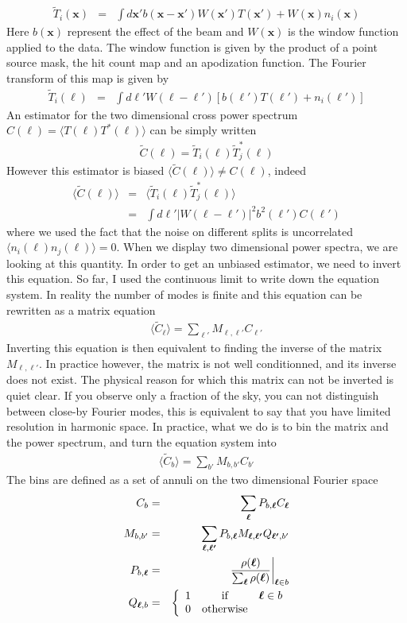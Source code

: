 \documentclass[a4paper, 11pt]{article}
\def\ba{\begin{eqnarray}}
\def\ea{\end{eqnarray}}
\begin{document}
\ba
\tilde{T}_{i}(\bm{x}) &=& \int d\bm{x'} b( \bm{x}-\bm{x'}) W(\bm{x'}) T(\bm{x'})+W( \bm{x}) n_{i} (\bm{x})  
\ea
Here $b( \bm{x})$ represent the effect of the beam and $W( \bm{x})$ is the window function applied to the data. The window function is given by the product of a point source mask, the hit count map and an apodization function. The Fourier transform of this map is given by
\ba
\tilde{T}_{i}(\bm{\ell}) &=& \int d\bm{\ell'} W (\bm{\ell}-\bm{\ell'}) \left[ b(\bm{\ell'}) T(\bm{\ell'}) + n_{i}(\bm{\ell'})\right] \label{eq:Tfourier}
\ea
An estimator for the two dimensional cross power spectrum $C(\bm{\ell})=\langle T(\bm{\ell}) T^{*}(\bm{\ell}) \rangle $ can be simply written  
\ba
\tilde{C}(\bm{\ell})=  \tilde{T}_{i}(\bm{\ell}) \tilde{T}^{*}_{j}(\bm{\ell})
\ea
However this estimator is biased $\langle \tilde{C}(\bm{\ell}) \rangle \neq C(\bm{\ell})$, indeed
\ba
\langle \tilde{C}(\bm{\ell}) \rangle &=& \langle  \tilde{T}_{i}(\bm{\ell}) \tilde{T}^{*}_{j}(\bm{\ell}) \rangle \\
&=&  \int d\bm{\ell'} | W (\bm{\ell}-\bm{\ell'})|^{2}b^{2}(\bm{\ell'})  C(\bm{\ell'})
\ea
where we used the fact that the noise on different splits is uncorrelated $ \langle n_{i}(\bm{\ell}) n_{j}(\bm{\ell}) \rangle=0$. When we display two dimensional power spectra, we are looking at this quantity. In order to get an unbiased estimator, we need to invert this equation. So far, I used the continuous limit to write down the equation system. In reality the number of modes is finite and this equation can be rewritten as a matrix equation
\ba
\langle \tilde{C}_{\bm{\ell}} \rangle= \sum_{\bm{\ell}'} M_{\bm{\ell}, \bm{\ell'}}  C_{\bm{\ell'}}
\ea 
Inverting this equation is then equivalent to finding the inverse of the matrix $ M_{\bm{\ell}, \bm{\ell'}} $. In practice however, the matrix is not well conditionned, and its inverse does not exist. The physical reason for which this matrix can not be inverted is quiet clear. If you observe only a fraction of the sky, you can not distinguish between close-by Fourier modes, this is equivalent to say that you have limited resolution in harmonic space. In practice, what we do is to bin the matrix and the power spectrum, and turn the equation system into
\ba
\langle \tilde{C}_{b} \rangle= \sum_{b'} M_{b, b'}  C_{b'} 
\ea 
The bins are defined as a set of annuli on the two dimensional Fourier space
\ba
C_{b} &=&\sum_{\bm \ell} P_{b, \bm{\ell}} C_{\bm{\ell}} \\
M_{b, b'} &=& \sum_{\bm{\ell},\bm{\ell'}} P_{b, \bm{\ell}} M_{\bm{\ell}, \bm{\ell'}} Q_{\bm{\ell'}, b'} \\
P_{b, \bm{\ell}}  &=& \frac{\rho(\bm{\ell})}{\sum_{\bm{\ell}}\rho(\bm{\ell})} \bigg{|}_{\bm{\ell} \in b}\\
Q_{ \bm{\ell},b} &=& \left\{ \begin{array}{rcl} 1 & \mbox{if} &  \bm{\ell} \in b \\ 0 & \mbox{otherwise}
\end{array}\right. 
\ea
\end{document}
